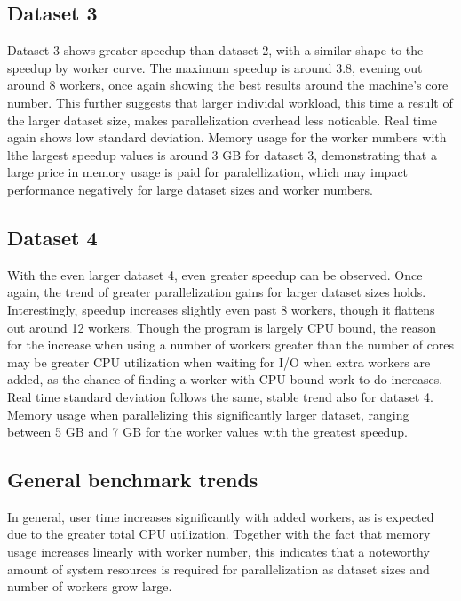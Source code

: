 \subsection{Dataset 3}
Dataset 3 shows greater speedup than dataset 2, with a similar shape to the speedup by worker curve. The maximum speedup is
around 3.8, evening out around 8 workers, once again showing the best results around the machine's core number. This further suggests that larger
individal workload, this time a result of the larger dataset size, makes parallelization overhead less noticable. Real time again shows
low standard deviation. Memory usage for the worker numbers with lthe largest speedup values is around 3 GB for dataset 3, demonstrating
that a large price in memory usage is paid for paralellization, which may impact performance negatively for large dataset sizes and
worker numbers.

\subsection{Dataset 4}
With the even larger dataset 4, even greater speedup can be observed. Once again, the trend of greater parallelization gains for larger
dataset sizes holds. Interestingly, speedup increases slightly even past 8 workers, though it flattens out around 12 workers.
Though the program is largely CPU bound, the reason for the increase when using a number of workers greater than the number of cores may be
greater CPU utilization when waiting for I/O when extra workers are added, as the chance of finding a worker with CPU bound work to do increases. 
Real time standard deviation follows the same, stable trend also for dataset 4.  Memory usage when parallelizing this significantly larger dataset,
ranging between 5 GB and 7 GB for the worker values with the greatest speedup.

\subsection{General benchmark trends}
In general, user time increases significantly with added workers, as is expected due to the greater total CPU utilization. Together with the
fact that memory usage increases linearly with worker number, this indicates that a noteworthy amount of system resources is required 
for parallelization as dataset sizes and number of workers grow large.
